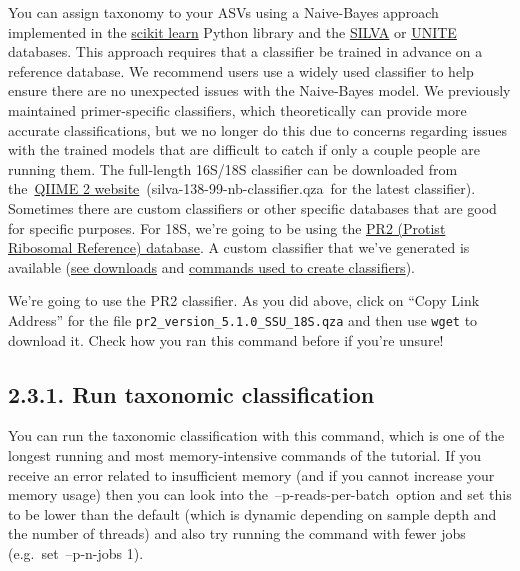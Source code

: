\documentclass[
]{book}
\begin{document}
You can assign taxonomy to your ASVs using a Naive-Bayes approach implemented in the \href{http://scikit-learn.org/stable/}{scikit learn} Python library and the \href{https://www.arb-silva.de/}{SILVA} or \href{https://unite.ut.ee/}{UNITE} databases. This approach requires that a classifier be trained in advance on a reference database. We recommend users use a widely used classifier to help ensure there are no unexpected issues with the Naive-Bayes model. We previously maintained primer-specific classifiers, which theoretically can provide more accurate classifications, but we no longer do this due to concerns regarding issues with the trained models that are difficult to catch if only a couple people are running them. The full-length 16S/18S classifier can be downloaded from the~\href{https://docs.qiime2.org/2022.11/data-resources/}{QIIME 2 website}~(silva-138-99-nb-classifier.qza~for the latest classifier). Sometimes there are custom classifiers or other specific databases that are good for specific purposes. For 18S, we're going to be using the \href{https://pr2-database.org/}{PR2 (Protist Ribosomal Reference) database}. A custom classifier that we've generated is available (\href{http://kronos.pharmacology.dal.ca/public_files/MH/taxa_classifiers/scikit-learn_v1.4.2_classifiers/}{see downloads} and \href{https://github.com/LangilleLab/microbiome_helper/wiki/Creating-QIIME-2-Taxonomic-Classifiers}{commands used to create classifiers}).

We're going to use the PR2 classifier. As you did above, click on ``Copy Link Address'' for the file \texttt{pr2\_version\_5.1.0\_SSU\_18S.qza} and then use \texttt{wget} to download it. Check how you ran this command before if you're unsure!

\subsection{2.3.1. Run taxonomic classification}\label{run-taxonomic-classification-1}

You can run the taxonomic classification with this command, which is one of the longest running and most memory-intensive commands of the tutorial. If you receive an error related to insufficient memory (and if you cannot increase your memory usage) then you can look into the~--p-reads-per-batch~option and set this to be lower than the default (which is dynamic depending on sample depth and the number of threads) and also try running the command with fewer jobs (e.g.~set~--p-n-jobs 1).
\end{document}
